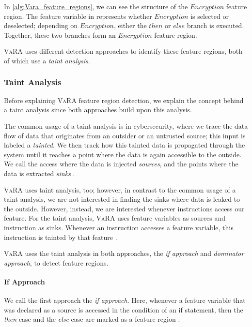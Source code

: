 In \autoref{alg:Vara_feature_regions}, we can see the structure of the $Encryption$ feature region. 
The feature variable in  represents whether $Encryption$ is selected or deselected; depending on $Encryption$, 
either the $then$ or $else$ branch is executed. 
Together, these two branches form an $Encryption$ feature region.

\textsc{VaRA} uses different detection approaches to identify these feature regions, both of which use a \emph{taint analysis}.

\subsubsection{Taint Analysis}
Before explaining \textsc{VaRA} feature region detection, we explain the concept behind a taint analysis since both approaches build upon this analysis.

The common usage of a taint analysis is in cybersecurity, where we trace the data flow of data that originates from an outsider or an untrusted source; 
this input is labeled a \emph{tainted}. 
We then track how this tainted data is propagated through the system until it reaches a point where the data is again accessible to the outside. 
We call the access where the data is injected \emph{sources}, and the points where the data is extracted \emph{sinks} \cite{TaintAnalysis}.

\textsc{VaRA} uses taint analysis, too; however, in contrast to the common usage of a taint analysis, 
we are not interested in finding the sinks where data is leaked to the outside. However, instead, we are interested whenever instructions access our feature. 
For the taint analysis, \textsc{VaRA} uses feature variables as sources and instruction as sinks. Whenever an instruction accesses a feature variable, 
this instruction is tainted by that feature \cite{VaRA-Janik}.

\textsc{VaRA} uses the taint analysis in both approaches, the \emph{if approach} and \emph{dominator approach}, to detect feature regions.

\paragraph{If Approach}
We call the first approach the \emph{if approach}. Here, whenever a feature variable that was declared as a source is accessed in the condition of an if statement, 
then the \emph{then} case and the \emph{else} case are marked as a feature region \cite{VaRA-Tom}.

